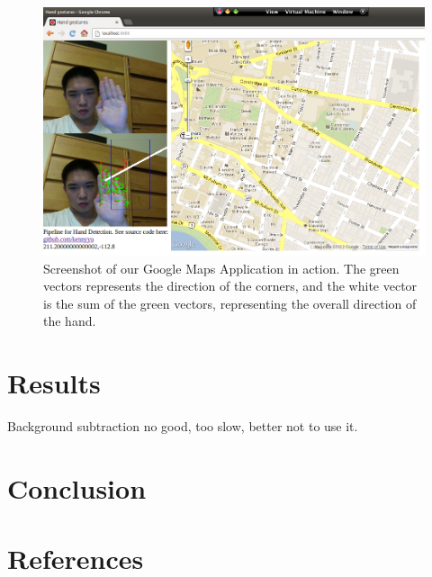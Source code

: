 \documentclass[12pt]{article}
\begin{document}
\noindent\begin{figure}[H]
\centering
\includegraphics[scale=0.45]{map.png}
\caption{Screenshot of our Google Maps Application in action. The green vectors represents the direction of the corners, and the white vector is the sum of the green vectors, representing the overall direction of the hand.}
\label{map}
\end{figure}

\section{Results}

Background subtraction no good, too slow, better not to use it. 

\section{Conclusion}

\section{References}
\end{document}
